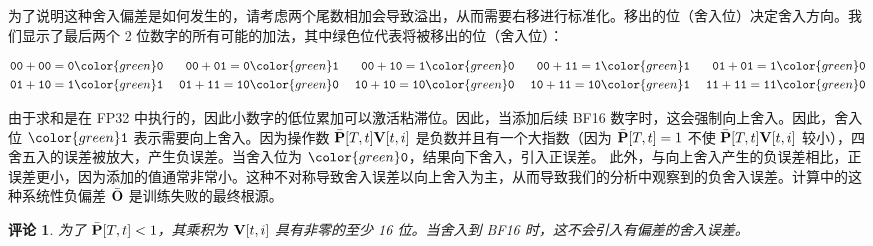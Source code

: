 \documentclass{article} %
\newtheorem{remark}{评论}
\begin{document}
为了说明这种舍入偏差是如何发生的，请考虑两个尾数相加会导致溢出，从而需要右移进行标准化。移出的位（舍入位）决定舍入方向。我们显示了最后两个 2 位数字的所有可能的加法，其中绿色位代表将被移出的位（舍入位）：
\begin{tcolorbox}[colback=black!5!white,
  colframe=black,
  boxrule=0.5pt,
  width=0.95\linewidth,
  arc=4pt,
  boxsep=1pt,
  halign=center,
  top=0pt,
  bottom=0.5pt,
  center
]
\vspace{-5pt}
\begin{align*}
  \mathtt{00}+\mathtt{00}=\mathtt{0}&{\color{green}\mathtt{0}} &\; \mathtt{00} + \mathtt{01} = \mathtt{0}&{\color{green}\mathtt{1}}& \; \mathtt{00} + \mathtt{10} = \mathtt{1}&{\color{green}\mathtt{0}} &\; \mathtt{00} + \mathtt{11} = \mathtt{1}&{\color{green}\mathtt{1}} &\; \mathtt{01} + \mathtt{01} = \mathtt{1}&{\color{green}\mathtt{0}} \\
  \mathtt{01} + \mathtt{10} = \mathtt{1}&{\color{green}\mathtt{1}} &\; \mathtt{01} + \mathtt{11} = \mathtt{10}&{\color{green}\mathtt{0}}& \; \mathtt{10}+\mathtt{10}=\mathtt{10}&{\color{green}\mathtt{0}} &\; \mathtt{10} + \mathtt{11} = \mathtt{10}&{\color{green}\mathtt{1}} &\; \mathtt{11} + \mathtt{11} = \mathtt{11}&{\color{green}\mathtt{0}}
\end{align*}
\end{tcolorbox}
由于求和是在 FP32 中执行的，因此小数字的低位累加可以激活粘滞位。因此，当添加后续 BF16 数字时，这会强制向上舍入。因此，舍入位 ${\color{green}\mathtt{1}}$ 表示需要向上舍入。因为操作数 $\bar{{\mathbf{P}}}[T, t]{\mathbf{V}}[t, i]$ 是负数并且有一个大指数（因为 $\bar{{\mathbf{P}}}[T, t]=1$ 不使 $\bar{{\mathbf{P}}}[T, t]{\mathbf{V}}[t, i]$ 较小），四舍五入的误差被放大，产生负误差。当舍入位为 ${\color{green}\mathtt{0}}$，结果向下舍入，引入正误差。
此外，与向上舍入产生的负误差相比，正误差更小，因为添加的值通常非常小。这种不对称导致舍入误差以向上舍入为主，从而导致我们的分析中观察到的负舍入误差。计算中的这种系统性负偏差 $\bar{{\mathbf{O}}}$ 是训练失败的最终根源。

\begin{remark}
  为了 $\bar{{\mathbf{P}}}[T, t] < 1$，其乘积为 ${\mathbf{V}}[t, i]$ 具有非零的至少 16 位。当舍入到 BF16 时，这不会引入有偏差的舍入误差。
\end{remark}

\end{document}
